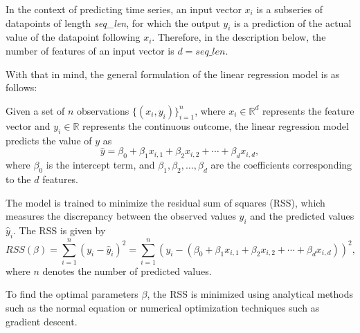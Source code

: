 In the context of predicting time series, an input vector \(x_i\) is a subseries of datapoints of length \textit{seq\_len}, for which the output \(y_i\) is a prediction of the actual value of the datapoint following \(x_i\). Therefore, in the description below, the number of features of an input vector is \(d = \textit{seq\_len}\).

With that in mind, the general formulation of the linear regression model is as follows:

Given a set of \(n\) observations \(\{(x_i, y_i)\}_{i=1}^n\), where \(x_i \in \mathbb{R}^d\) represents the feature vector and \(y_i \in \mathbb{R}\) represents the continuous outcome, the linear regression model predicts the value of \(y\) as
\[
	\hat{y} = \beta_0 + \beta_1 x_{i,1} + \beta_2 x_{i,2} + \cdots + \beta_d x_{i,d},
\]
where \(\beta_0\) is the intercept term, and \(\beta_1, \beta_2, \ldots, \beta_d\) are the coefficients corresponding to the \(d\) features.

The model is trained to minimize the residual sum of squares (RSS), which measures the discrepancy between the observed values \(y_i\) and the predicted values \(\hat{y}_i\). The RSS is given by
\[
	RSS(\beta) = \sum_{i=1}^n (y_i - \hat{y}_i)^2 = \sum_{i=1}^n \left(y_i - (\beta_0 + \beta_1 x_{i,1} + \beta_2 x_{i,2} + \cdots + \beta_d x_{i,d})\right)^2,
\]
where \(n\) denotes the number of predicted values.

To find the optimal parameters \(\beta\), the RSS is minimized using analytical methods such as the normal equation or numerical optimization techniques such as gradient descent.








